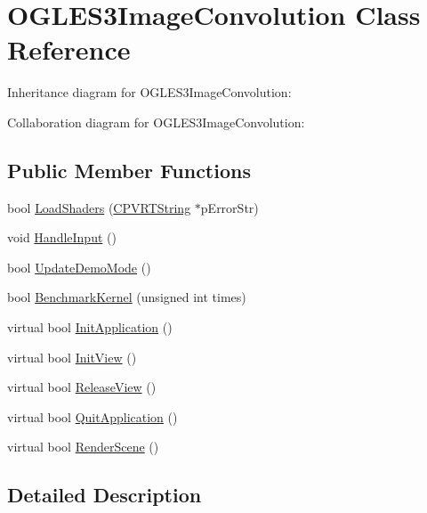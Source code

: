 \hypertarget{class_o_g_l_e_s3_image_convolution}{\section{O\+G\+L\+E\+S3\+Image\+Convolution Class Reference}
\label{class_o_g_l_e_s3_image_convolution}
}


Inheritance diagram for O\+G\+L\+E\+S3\+Image\+Convolution\+:


Collaboration diagram for O\+G\+L\+E\+S3\+Image\+Convolution\+:
\subsection*{Public Member Functions}
\begin{DoxyCompactItemize}
\item 
bool \hyperlink{class_o_g_l_e_s3_image_convolution_af7e1b7bdd9c8b9f01fd6a65d24bf522a}{Load\+Shaders} (\hyperlink{class_c_p_v_r_t_string}{C\+P\+V\+R\+T\+String} $\ast$p\+Error\+Str)
\item 
void \hyperlink{class_o_g_l_e_s3_image_convolution_a2524631fe37f9d6667e38d775046bc16}{Handle\+Input} ()
\item 
bool \hyperlink{class_o_g_l_e_s3_image_convolution_a3c104523d4cadb27c4034822b521a77a}{Update\+Demo\+Mode} ()
\item 
bool \hyperlink{class_o_g_l_e_s3_image_convolution_a64b4a9004ddd25e2ad614eabb998ba7e}{Benchmark\+Kernel} (unsigned int times)
\item 
virtual bool \hyperlink{class_o_g_l_e_s3_image_convolution_a934875462e4dd01a93310b6c453d56b3}{Init\+Application} ()
\item 
virtual bool \hyperlink{class_o_g_l_e_s3_image_convolution_afe6795320d4afc3f6ee900541a98be13}{Init\+View} ()
\item 
virtual bool \hyperlink{class_o_g_l_e_s3_image_convolution_a1254b21c1fd089e2f90c5aedccc53ee4}{Release\+View} ()
\item 
virtual bool \hyperlink{class_o_g_l_e_s3_image_convolution_a7b8be3712118991f605285aa5b457cbb}{Quit\+Application} ()
\item 
virtual bool \hyperlink{class_o_g_l_e_s3_image_convolution_ae666c5b9e7606ea49b71d5c79a2f0d14}{Render\+Scene} ()
\end{DoxyCompactItemize}


\subsection{Detailed Description}


